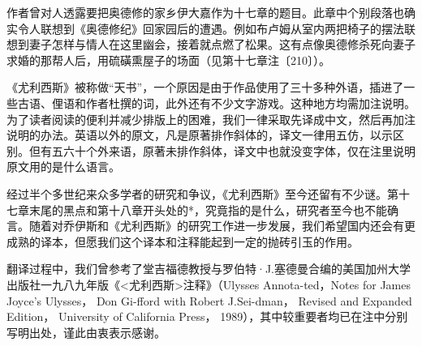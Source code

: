 \par 作者曾对人透露要把奥德修的家乡伊大嘉作为十七章的题目。此章中个别段落也确实令人联想到《奥德修纪》回家园后的遭遇。例如布卢姆从室内两把椅子的摆法联想到妻子怎样与情人在这里幽会，接着就点燃了松果。这有点像奥德修杀死向妻子求婚的那帮人后，用硫磺熏屋子的场面（见第十七章注〔210〕）。
\par 《尤利西斯》被称做“天书”，一个原因是由于作品使用了三十多种外语，插进了一些古语、俚语和作者杜撰的词，此外还有不少文字游戏。这种地方均需加注说明。为了读者阅读的便利并减少排版上的困难，我们一律采取先译成中文，然后再加注说明的办法。英语以外的原文，凡是原著排作斜体的，译文一律用五仿，以示区别。但有五六十个外来语，原著未排作斜体，译文中也就没变字体，仅在注里说明原文用的是什么语言。
\par 经过半个多世纪来众多学者的研究和争议，《尤利西斯》至今还留有不少谜。第十七章末尾的黑点和第十八章开头处的*，究竟指的是什么，研究者至今也不能确言。随着对乔伊斯和《尤利西斯》的研究工作进一步发展，我们希望国内还会有更成熟的译本，但愿我们这个译本和注释能起到一定的抛砖引玉的作用。
\par 翻译过程中，我们曾参考了堂吉福德教授与罗伯特·J.塞德曼合编的美国加州大学出版社一九八九年版《<尤利西斯>注释》（Ulysses Annota-ted，Notes for James Joyce’s Ulysses， Don Gi-fford with Robert J.Sei-dman， Revised and Expanded Edition， University of California Press， 1989），其中较重要者均已在注中分别写明出处，谨此由衷表示感谢。
\par {}










